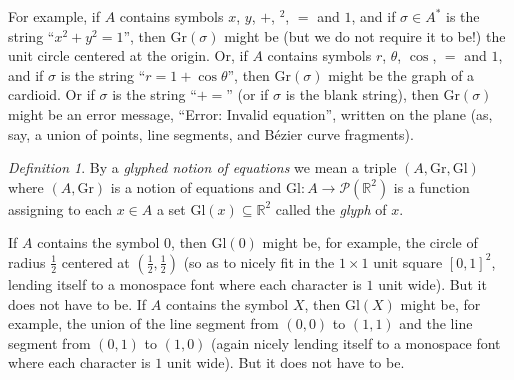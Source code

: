 \documentclass[table, svgnames, dvipsnames, letterpaper, 11pt]{report}
\theoremstyle{remark}
\newtheorem{definition}[theorem]{Definition}
\begin{document}
For example, if $A$ contains symbols $x$, $y$, $+$, ${}^2$, $=$ and $1$, and
if $\sigma\in A^*$ is the string ``$x^2+y^2=1$'', then $\mathrm{Gr}(\sigma)$
might be (but we do not require it to be!) the unit circle centered at the
origin. Or, if $A$ contains symbols $r$, $\theta$, $\cos$,
$=$ and $1$, and if $\sigma$ is the string ``$r=1+\cos\theta$'', then
$\mathrm{Gr}(\sigma)$ might be the graph
of a cardioid. Or if $\sigma$ is the string ``$+=$''
(or if $\sigma$ is the blank string), then $\mathrm{Gr}(\sigma)$
might be an error message, ``Error: Invalid
equation'', written on the plane (as, say, a union of points, line segments,
and B\'ezier curve fragments).

\begin{definition}
  By a \emph{glyphed notion of equations} we mean a triple
  $(A,\mathrm{Gr},\mathrm{Gl})$ where $(A,\mathrm{Gr})$ is a notion
  of equations and $\mathrm{Gl}:A\to\mathscr{P}(\mathbb R^2)$
  is a function assigning to each $x\in A$ a set
  $\mathrm{Gl}(x)\subseteq\mathbb R^2$ called the \emph{glyph} of $x$.
\end{definition}

If $A$ contains the symbol $0$, then $\mathrm{Gl}(0)$ might be,
for example, the circle of radius $\frac12$ centered at
$(\frac12,\frac12)$ (so as to nicely fit in the $1\times 1$ unit
square $[0,1]^2$, lending itself to a monospace font where each character
is $1$ unit wide). But it does not have to be. If $A$ contains the symbol $X$,
then $\mathrm{Gl}(X)$ might be, for example, the union of the line segment from
$(0,0)$ to $(1,1)$ and the line segment from $(0,1)$ to $(1,0)$ (again nicely
lending itself to a monospace font where each character is $1$ unit wide). But
it does not have to be.
\end{document}
